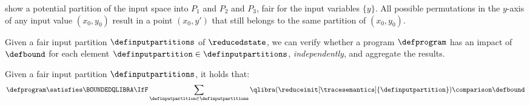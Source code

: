\begin{example}
   show a potential partition of the input space into $P_1$ and $P_2$ and $P_3$, fair for the input variables $\{y\}$.
  All possible permutations in the $y$-axis of any input value $(x_0, y_0)$ result in a point $(x_0, y')$ that still belongs to the same partition of $(x_0, y_0)$.
\end{example}

Given a fair input partition $\definputpartitions$ of $\reducedstate$, we can verify whether a program $\defprogram$ has an impact of $\defbound$ for each element $\definputpartition\in\definputpartitions$, \emph{independently}, and aggregate the results.

\begin{lemma}
  Given a fair input partition $\definputpartitions$, it holds that:
  \begin{align*}
    \defprogram \satisfies \BOUNDEDQLIBRA \IfF
    \sum_{\definputpartition\in\definputpartitions} \qlibra(
      \reduceinit[\tracesemantics]{\definputpartition}
    ) \comparison \defbound
  \end{align*}
\end{lemma}
